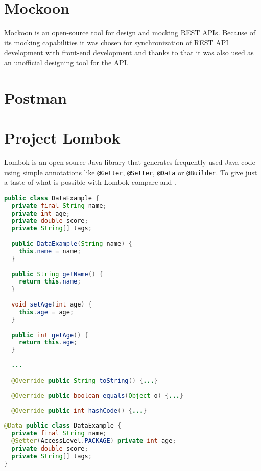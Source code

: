 \section{Mockoon} \label{sec:mockoon}
Mockoon is an open-source tool for design and mocking REST APIs.
Because of its mocking capabilities it was chosen for synchronization of REST API development with front-end development \cite{drobnakm} and thanks to that it was also used as an unofficial designing tool for the API.


\section{Postman} \label{sec:postman}


\section{Project Lombok} \label{sec:lombok}
Lombok is an open-source Java library that generates frequently used Java code using simple annotations like \texttt{@Getter}, \texttt{@Setter}, \texttt{@Data} or \texttt{@Builder}.
To give just a taste of what is possible with Lombok compare  and .
\begin{lstlisting}[language=Java, caption=Vanilla Java, label=lst:vanilla]
public class DataExample {
  private final String name;
  private int age;
  private double score;
  private String[] tags;
  
  public DataExample(String name) {
    this.name = name;
  }
  
  public String getName() {
    return this.name;
  }
  
  void setAge(int age) {
    this.age = age;
  }
  
  public int getAge() {
    return this.age;
  }
  
  ...
  
  @Override public String toString() {...}
  
  @Override public boolean equals(Object o) {...}
  
  @Override public int hashCode() {...}
\end{lstlisting}
\begin{lstlisting}[language=Java, caption=Java with Lombok, label=lst:lombok]
@Data public class DataExample {
  private final String name;
  @Setter(AccessLevel.PACKAGE) private int age;
  private double score;
  private String[] tags;
}
\end{lstlisting}
\cite{lombok}


